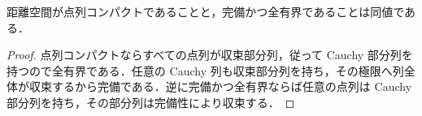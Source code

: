 \begin{prop}
距離空間が点列コンパクトであることと，完備かつ全有界であることは同値である．
\end{prop}
\begin{proof}
点列コンパクトならすべての点列が収束部分列，従って Cauchy 部分列を持つので全有界である．任意の Cauchy 列も収束部分列を持ち，その極限へ列全体が収束するから完備である．逆に完備かつ全有界ならば任意の点列は Cauchy 部分列を持ち，その部分列は完備性により収束する．
\end{proof}
